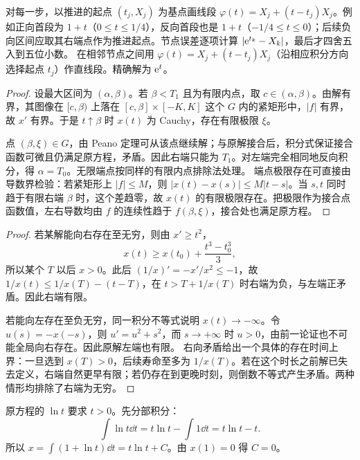 对每一步，以推进的起点 $(t_j,X_j)$ 为基点画线段 $\varphi(t)=X_j+(t-t_j)X_j$。例如正向首段为 $1+t$（$0\le t\le1/4$），反向首段也是 $1+t$（$-1/4\le t\le0$）；后续负向区间应取其右端点作为推进起点。节点误差逐项计算 $|\mathrm e^{t_k}-X_k|$，最后才四舍五入到五位小数。
在相邻节点之间用 $\varphi(t)=X_j+(t-t_j)X_j$（沿相应积分方向选择起点 $t_j$）作直线段。精确解为 $\mathrm e^t$。


\begin{proof}
设最大区间为 $(\alpha,\beta)$。若 $\beta<T_1$ 且为有限内点，取 $c\in(\alpha,\beta)$。由解有界，其图像在 $[c,\beta)$ 上落在 $[c,\beta]\times[-K,K]$ 这个 $G$ 内的紧矩形中，$|f|$ 有界，故 $x'$ 有界。于是 $t\uparrow\beta$ 时 $x(t)$ 为 Cauchy，存在有限极限 $\xi$。

点 $(\beta,\xi)\in G$，由 Peano 定理可从该点继续解；与原解接合后，积分式保证接合函数可微且仍满足原方程，矛盾。因此右端只能为 $T_1$。对左端完全相同地反向积分，得 $\alpha=T_0$。无限端点按同样的有限内点排除法处理。
端点极限存在可直接由导数界检验：若紧矩形上 $|f|\le M$，则 $|x(t)-x(s)|\le M|t-s|$。当 $s,t$ 同时趋于有限右端 $\beta$ 时，这个差趋零，故 $x(t)$ 的有限极限存在。把极限作为接合点函数值，左右导数均由 $f$ 的连续性趋于 $f(\beta,\xi)$，接合处也满足原方程。
\end{proof}
\begin{proof}
若某解能向右存在至无穷，则由 $x'\ge t^2$，
\[
 x(t)\ge x(t_0)+\dfrac{t^3-t_0^3}{3},
\]
所以某个 $T$ 以后 $x>0$。此后 $(1/x)'=-x'/x^2\le-1$，故 $1/x(t)\le1/x(T)-(t-T)$，在 $t>T+1/x(T)$ 时右端为负，与左端正矛盾。因此右端有限。

若能向左存在至负无穷，同一积分不等式说明 $x(t)\to-\infty$。令 $u(s)=-x(-s)$，则 $u'=u^2+s^2$，而 $s\to+\infty$ 时 $u>0$，由前一论证也不可能全局向右存在。因此原解左端也有限。
右向矛盾给出一个具体的存在时间上界：一旦选到 $x(T)>0$，后续寿命至多为 $1/x(T)$。若在这个时长之前解已失去定义，右端自然更早有限；若仍存在到更晚时刻，则倒数不等式产生矛盾。两种情形均排除了右端为无穷。
\end{proof}
原方程的 $\ln t$ 要求 $t>0$。先分部积分：
\[
\int\ln t\dd t=t\ln t-\int1\dd t=t\ln t-t.
\]
所以 $\displaystyle x=\int(1+\ln t)\dd t=t\ln t+C$。由 $x(1)=0$ 得 $C=0$。

